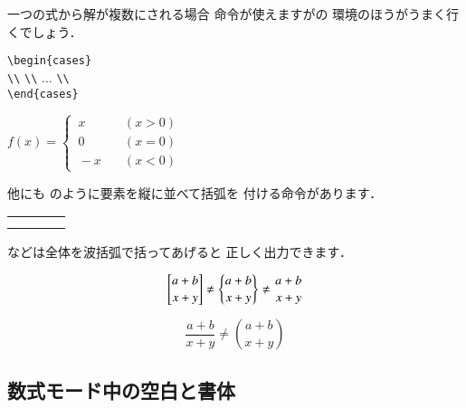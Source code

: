 一つの式から解が複数に{}される場合 
命令が使えますがの
環境のほうがうまく行くでしょう．
\begin{Syntax}
\verb|\begin{cases}|\\
 \verb|\\|  
 \verb|\\| $\ldots$ \verb|\\| \\
\verb|\end{cases}|
\end{Syntax}
\begin{InOut}
\( f(x) = \begin{cases}
 \,x & \quad(x>0)\\ 
 \,0 & \quad(x=0)\\
 \,-x & \quad(x<0)
  \end{cases} \)
\end{InOut}
他にも のように要素を縦に並べて括弧を
付ける命令があります．
%
%
%
%
%
%
\begin{Syntax}
\begin{tabular}{llll}
\C{choose} & \pp{\Z{丸括弧}付き} & \C{brack} & \pp{\Z{角括弧}付き}\\
\C{brace}  & \pp{\Z{波括弧}付き} & \C{atop}  & \pp{括弧なし}
\end{tabular}
\end{Syntax}
などは全体を波括弧で括ってあげると
正しく出力できます．
\begin{InOut}
\[ {a + b \brack x + y} \neq 
   {a + b \brace x + y} \neq 
   {a + b \atop  x + y}  \]
\end{InOut}

\begin{InOut}
\begin{displaymath}
\frac{a+b}{x+y} \neq \binom{a+b}{x+y}
\end{displaymath} 
\end{InOut}


\subsection{数式モード中の空白と書体}


